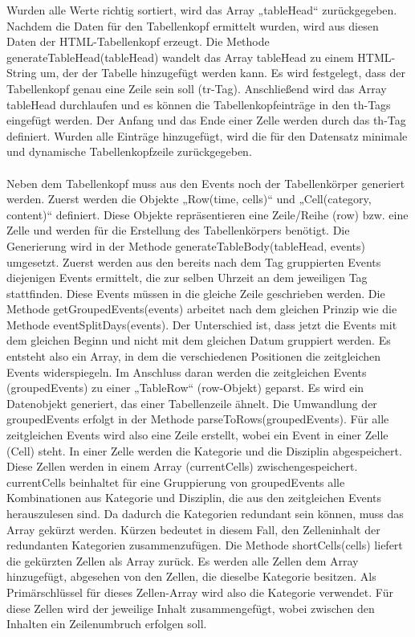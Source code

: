 Wurden alle Werte richtig sortiert, wird das Array „tableHead“ zurückgegeben.
Nachdem die Daten für den Tabellenkopf ermittelt wurden, wird aus diesen Daten der HTML-Tabellenkopf erzeugt. Die Methode generateTableHead(tableHead) wandelt das Array tableHead zu einem HTML-String um, der der Tabelle hinzugefügt werden kann. Es wird festgelegt, dass der Tabellenkopf genau eine Zeile sein soll (tr-Tag). Anschließend wird das Array tableHead durchlaufen und es können die Tabellenkopfeinträge in den th-Tags eingefügt werden. Der Anfang und das Ende einer Zelle werden durch das th-Tag definiert. Wurden alle Einträge hinzugefügt, wird die für den Datensatz minimale und dynamische Tabellenkopfzeile zurückgegeben.\\
\\
Neben dem Tabellenkopf muss aus den Events noch der Tabellenkörper generiert werden. Zuerst werden die Objekte „Row(time, cells)“ und „Cell(category, content)“ definiert. Diese Objekte repräsentieren eine Zeile/Reihe (row) bzw. eine Zelle und werden für die Erstellung des Tabellenkörpers benötigt. 
Die Generierung wird in der Methode generateTableBody(tableHead, events) umgesetzt. Zuerst werden aus den bereits nach dem Tag gruppierten Events diejenigen Events ermittelt, die zur selben Uhrzeit an dem jeweiligen Tag stattfinden. Diese Events müssen in die gleiche Zeile geschrieben werden. Die Methode getGroupedEvents(events) arbeitet nach dem gleichen Prinzip wie die Methode eventSplitDays(events). Der Unterschied ist, dass jetzt die Events mit dem gleichen Beginn und nicht mit dem gleichen Datum gruppiert werden. Es entsteht also ein Array, in dem die verschiedenen Positionen die zeitgleichen Events widerspiegeln.
Im Anschluss daran werden die zeitgleichen Events (groupedEvents) zu einer „TableRow“ (row-Objekt) geparst. Es wird ein Datenobjekt generiert, das einer Tabellenzeile ähnelt. Die Umwandlung der groupedEvents erfolgt in der Methode parseToRows(groupedEvents). Für alle zeitgleichen Events wird also eine Zeile erstellt, wobei ein Event in einer Zelle (Cell) steht. In einer Zelle werden die Kategorie und die Disziplin abgespeichert. Diese Zellen werden in einem Array (currentCells) zwischengespeichert. currentCells beinhaltet für eine Gruppierung von groupedEvents alle Kombinationen aus Kategorie und Disziplin, die aus den zeitgleichen Events herauszulesen sind. Da dadurch die Kategorien redundant sein können, muss das Array gekürzt werden. Kürzen bedeutet in diesem Fall, den Zelleninhalt der redundanten Kategorien zusammenzufügen.
Die Methode shortCells(cells) liefert die gekürzten Zellen als Array zurück. Es werden alle Zellen dem Array hinzugefügt, abgesehen von den Zellen, die dieselbe Kategorie besitzen. Als Primärschlüssel für dieses Zellen-Array wird also die Kategorie verwendet. Für diese Zellen wird der jeweilige Inhalt zusammengefügt, wobei zwischen den Inhalten ein Zeilenumbruch erfolgen soll. 
